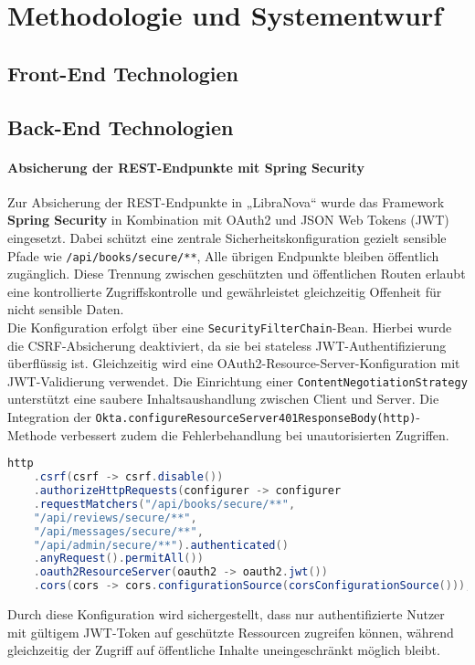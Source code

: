 \chapter{Methodologie und Systementwurf }



\section{Front-End Technologien}


\section{Back-End Technologien}


\subsubsection{Absicherung der REST-Endpunkte mit Spring Security}

Zur Absicherung der REST-Endpunkte in „LibraNova“ wurde das Framework \textbf{Spring Security} in Kombination mit OAuth2 und JSON Web Tokens (JWT) eingesetzt. Dabei schützt eine zentrale Sicherheitskonfiguration gezielt sensible Pfade wie \texttt{/api/books/secure/\***}, Alle übrigen Endpunkte bleiben öffentlich zugänglich. Diese Trennung zwischen geschützten und öffentlichen Routen erlaubt eine kontrollierte Zugriffskontrolle und gewährleistet gleichzeitig Offenheit für nicht sensible Daten. \\ 
Die Konfiguration erfolgt über eine \texttt{SecurityFilterChain}-Bean. Hierbei wurde die CSRF-Absicherung deaktiviert, da sie bei stateless JWT-Authentifizierung überflüssig ist. Gleichzeitig wird eine OAuth2-Resource-Server-Konfiguration mit JWT-Validierung verwendet. Die Einrichtung einer \texttt{ContentNegotiationStrategy} unterstützt eine saubere Inhaltsaushandlung zwischen Client und Server. Die Integration der \texttt{Okta.configureResourceServer401ResponseBody(http)}-Methode verbessert zudem die Fehlerbehandlung bei unautorisierten Zugriffen.

\begin{lstlisting}[language=Java, caption={Spring Security-Konfiguration}]
	http
	.csrf(csrf -> csrf.disable())
	.authorizeHttpRequests(configurer -> configurer
	.requestMatchers("/api/books/secure/**", 
	"/api/reviews/secure/**", 
	"/api/messages/secure/**", 
	"/api/admin/secure/**").authenticated()
	.anyRequest().permitAll())
	.oauth2ResourceServer(oauth2 -> oauth2.jwt())
	.cors(cors -> cors.configurationSource(corsConfigurationSource()));
\end{lstlisting}
Durch diese Konfiguration wird sichergestellt, dass nur authentifizierte Nutzer mit gültigem JWT-Token auf geschützte Ressourcen zugreifen können, während gleichzeitig der Zugriff auf öffentliche Inhalte uneingeschränkt möglich bleibt.

